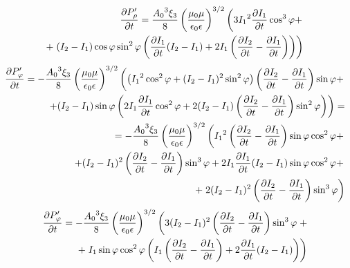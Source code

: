%
\begin{equation*} \begin{aligned}
\frac{\partial P_\rho^\prime}{\partial t} = \frac{ {A_0}^3 \xi_3 }{ 8 } 
\left( \frac{\mu_0 \mu} {\epsilon_0 \epsilon} \right)^{3/2} \left(
3 {I_1}^2 \frac{\partial I_1}{\partial t} \cos^3 \varphi + \right. \\
+ \left. ( I_2 - I_1 ) \cos \varphi \sin^2 \varphi \left( 
\frac{\partial I_1}{\partial t} ( I_2 - I_1 ) + 2 I_1 \left( \frac{\partial I_2}{\partial t} - 
\frac{\partial I_1}{\partial t} \right) \right) \right)
\end{aligned} \end{equation*}
%
\textcolor{lightgray} { \begin{equation*} \begin{aligned}
\frac{\partial P_\varphi^\prime}{\partial t}   = - \frac{ {A_0}^3 \xi_3 }{ 8 } 
\left( \frac{\mu_0 \mu} {\epsilon_0 \epsilon} \right)^{3/2} \left(
\left( {I_1}^2 \cos^2 \varphi + ( I_2 - I_1 )^2 \sin^2 \varphi \right)
\left( \frac{\partial I_2}{\partial t} - \frac{\partial I_1}{\partial t} \right) \sin \varphi + \right. \\
\left. + (I_2 - I_1) \sin \varphi \left( 2 I_1 \frac{\partial I_1}{\partial t} \cos^2 \varphi + 
2 ( I_2 - I_1 ) \left( \frac{\partial I_2}{\partial t} - \frac{\partial I_1}{\partial t} \right) 
\sin^2 \varphi \right) \right) = \\ = - \frac{ {A_0}^3 \xi_3 }{ 8 } 
\left( \frac{\mu_0 \mu} {\epsilon_0 \epsilon} \right)^{3/2} \left(
{I_1}^2 \left( \frac{\partial I_2}{\partial t} - \frac{\partial I_1}{\partial t} \right) 
\sin \varphi \cos^2 \varphi + \right. \\ \left. 
+ ( I_2 - I_1 )^2 \left( \frac{\partial I_2}{\partial t} - \frac{\partial I_1}{\partial t} \right) 
\sin^3 \varphi + 2 I_1 \frac{\partial I_1}{\partial t} (I_2 - I_1) 
\sin \varphi \cos^2 \varphi + \right. \\ 
+ \left. 2 ( I_2 - I_1 )^2 \left( \frac{\partial I_2}{\partial t} - \frac{\partial I_1}{\partial t} \right) 
\sin^3 \varphi \right)
\end{aligned} \end{equation*} }
%
\begin{equation*} \begin{aligned}
\frac{\partial P_\varphi^\prime}{\partial t} = - \frac{ {A_0}^3 \xi_3 }{ 8 } 
\left( \frac{\mu_0 \mu} {\epsilon_0 \epsilon} \right)^{3/2} \left(
3 ( I_2 - I_1 )^2 \left( \frac{\partial I_2}{\partial t} - \frac{\partial I_1}{\partial t} \right)
\sin^3 \varphi \right. + \\
+ \left. I_1 \sin \varphi \cos^2 \varphi \left( 
I_1 \left( \frac{\partial I_2}{\partial t} - \frac{\partial I_1}{\partial t} \right) + 
2 \frac{\partial I_1}{\partial t} (I_2 - I_1) \right) \right)
\end{aligned} \end{equation*}
